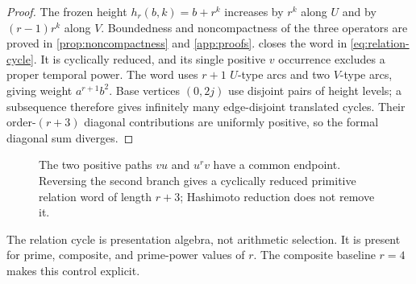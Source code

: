 \begin{proof}
The frozen height $h_r(b,k)=b+r^k$ increases by $r^k$ along $U$ and by
$(r-1)r^k$ along $V$.  Boundedness and noncompactness of the three operators are proved in
\cref{prop:noncompactness} and \cref{app:proofs}.
 closes the word in
\cref{eq:relation-cycle}.  It is cyclically reduced, and its single positive
$v$ occurrence excludes a proper temporal power.  The word uses $r+1$
$U$-type arcs and two $V$-type arcs, giving weight $a^{r+1}b^2$.
Base vertices $(0,2j)$ use disjoint pairs of height levels; a subsequence
therefore gives infinitely many edge-disjoint translated cycles.  Their
order-$(r+3)$ diagonal contributions are uniformly positive, so the formal
diagonal sum diverges.
\end{proof}

\begin{figure}[t]
\centering

\caption{The two positive paths $vu$ and $u^rv$ have a common endpoint.
Reversing the second branch gives a cyclically reduced primitive relation
word of length $r+3$; Hashimoto reduction does not remove it.}
\label{fig:polygon}
\end{figure}

\begin{remark}
The relation cycle is presentation algebra, not arithmetic selection.  It is
present for prime, composite, and prime-power values of $r$.  The composite
baseline $r=4$ makes this control explicit.
\end{remark}
